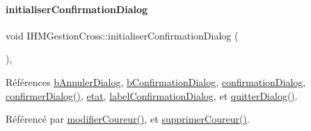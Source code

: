 \mbox{\label{class_i_h_m_gestion_cross_a1d3c7f83d4c960f38b237499d2a89731}} 
\paragraph{\texorpdfstring{initialiser\+Confirmation\+Dialog}{initialiserConfirmationDialog}\hspace{0.1cm}{\footnotesize\ttfamily [2/2]}}
{\footnotesize\ttfamily void I\+H\+M\+Gestion\+Cross\+::initialiser\+Confirmation\+Dialog (\begin{DoxyParamCaption}{ }\end{DoxyParamCaption})\hspace{0.3cm}{\ttfamily [private]}, {\ttfamily [slot]}}



Références \hyperlink{class_i_h_m_gestion_cross_a2efd604a10cae21b2f85e7196c3927fd}{b\+Annuler\+Dialog}, \hyperlink{class_i_h_m_gestion_cross_a8aaf51ea455654df21f65ed496384b60}{b\+Confirmation\+Dialog}, \hyperlink{class_i_h_m_gestion_cross_a417b63ff11c3be6623d17718d9058768}{confirmation\+Dialog}, \hyperlink{class_i_h_m_gestion_cross_a144933ab31ae263be7267b93bfd53a82}{confirmer\+Dialog()}, \hyperlink{class_i_h_m_gestion_cross_a5da4390d71dbd5d05cff339f93c7c85a}{etat}, \hyperlink{class_i_h_m_gestion_cross_a9b51d06493979981248ecc2641f82be4}{label\+Confirmation\+Dialog}, et \hyperlink{class_i_h_m_gestion_cross_a58b19fa84a16060a3dd951abeba2c543}{quitter\+Dialog()}.



Référencé par \hyperlink{class_i_h_m_gestion_cross_a1f41cea488ab477505f9d1792c4c2f36}{modifier\+Coureur()}, et \hyperlink{class_i_h_m_gestion_cross_a4fd00fda0e47366d66d046e344a1617e}{supprimer\+Coureur()}.


